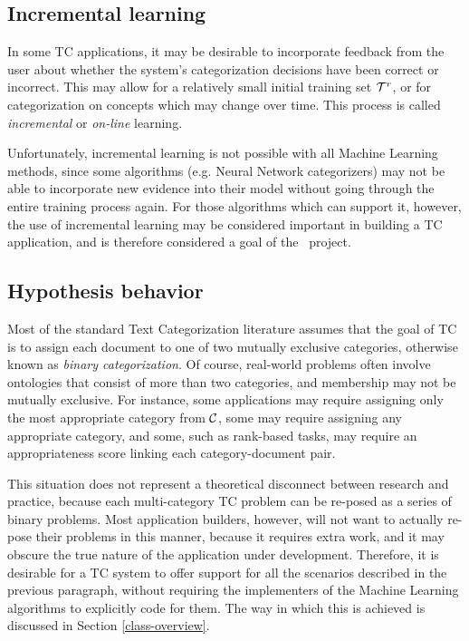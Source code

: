 \subsection{Incremental learning}

In some TC applications, it may be desirable to incorporate feedback
from the user about whether the system's categorization decisions have
been correct or incorrect.\cite[p. 28]{sebastiani:02} This may allow
for a relatively small initial training set $\mathcal{T}^r$, or for
categorization on concepts which may change over time.  This process
is called \emph{incremental} or \emph{on-line} learning.

Unfortunately, incremental learning is not possible with all Machine
Learning methods, since some algorithms (e.g. Neural Network
categorizers) may not be able to incorporate new evidence into their
model without going through the entire training process again.  For
those algorithms which can support it, however, the use of incremental
learning may be considered important in building a TC application, and
is therefore considered a goal of the \aicat\ project.

\subsection{Hypothesis behavior}
\label{Hypothesis behavior}

Most of the standard Text Categorization literature assumes that the
goal of TC is to assign each document to one of two mutually exclusive
categories, otherwise known as \emph{binary
categorization}.\cite[p. 3]{sebastiani:02} Of course, real-world
problems often involve ontologies that consist of more than two
categories, and membership may not be mutually exclusive.  For
instance, some applications may require assigning only the most
appropriate category from $\mathcal{C}$, some may require assigning any
appropriate category, and some, such as rank-based tasks, may require
an appropriateness score linking each category-document pair.

This situation does not represent a theoretical disconnect between
research and practice, because each multi-category TC problem can be
re-posed as a series of binary problems.  Most application builders,
however, will not want to actually re-pose their problems in this
manner, because it requires extra work, and it may obscure the true
nature of the application under development.  Therefore, it is
desirable for a TC system to offer support for all the scenarios
described in the previous paragraph, without requiring the
implementers of the Machine Learning algorithms to explicitly code for
them.  The way in which this is achieved is discussed in Section
\ref{class-overview}.

